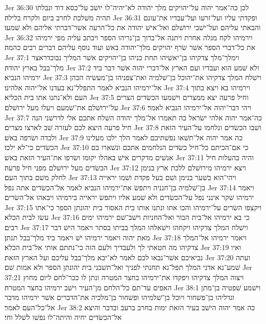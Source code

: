 Jer 36:30  לכן כה־אמר יהוה על־יהויקים מלך יהודה לא־יהיה־לו יושׁב על־כסא דוד ונבלתו תהיה משׁלכת לחרב ביום ולקרח בלילה׃
Jer 36:31  ופקדתי עליו ועל־זרעו ועל־עבדיו את־עונם והבאתי עליהם ועל־ישׁבי ירושׁלם ואל־אישׁ יהודה את כל־הרעה אשׁר־דברתי אליהם ולא שׁמעו׃
Jer 36:32  וירמיהו לקח מגלה אחרת ויתנה אל־ברוך בן־נריהו הספר ויכתב עליה מפי ירמיהו את כל־דברי הספר אשׁר שׂרף יהויקים מלך־יהודה באשׁ ועוד נוסף עליהם דברים רבים כהמה׃
Jer 37:1  וימלך־מלך צדקיהו בן־יאשׁיהו תחת כניהו בן־יהויקים אשׁר המליך נבוכדראצר מלך־בבל בארץ יהודה׃
Jer 37:2  ולא שׁמע הוא ועבדיו ועם הארץ אל־דברי יהוה אשׁר דבר ביד ירמיהו הנביא׃
Jer 37:3  וישׁלח המלך צדקיהו את־יהוכל בן־שׁלמיה ואת־צפניהו בן־מעשׂיה הכהן אל־ירמיהו הנביא לאמר התפלל־נא בעדנו אל־יהוה אלהינו׃
Jer 37:4  וירמיהו בא ויצא בתוך העם ולא־נתנו אתו בית הכליא׃
Jer 37:5  וחיל פרעה יצא ממצרים וישׁמעו הכשׂדים הצרים על־ירושׁלם את־שׁמעם ויעלו מעל ירושׁלם׃
Jer 37:6  ויהי דבר־יהוה אל־ירמיהו הנביא לאמר׃
Jer 37:7  כה־אמר יהוה אלהי ישׂראל כה תאמרו אל־מלך יהודה השׁלח אתכם אלי לדרשׁני הנה חיל פרעה היצא לכם לעזרה שׁב לארצו מצרים׃
Jer 37:8  ושׁבו הכשׂדים ונלחמו על־העיר הזאת ולכדה ושׂרפה באשׁ׃
Jer 37:9  כה אמר יהוה אל־תשׁאו נפשׁתיכם לאמר הלך ילכו מעלינו הכשׂדים כי־לא ילכו׃
Jer 37:10  כי אם־הכיתם כל־חיל כשׂדים הנלחמים אתכם ונשׁארו בם אנשׁים מדקרים אישׁ באהלו יקומו ושׂרפו את־העיר הזאת באשׁ׃
Jer 37:11  והיה בהעלות חיל הכשׂדים מעל ירושׁלם מפני חיל פרעה׃
Jer 37:12  ויצא ירמיהו מירושׁלם ללכת ארץ בנימן לחלק משׁם בתוך העם׃
Jer 37:13  ויהי־הוא בשׁער בנימן ושׁם בעל פקדת ושׁמו יראייה בן־שׁלמיה בן־חנניה ויתפשׂ את־ירמיהו הנביא לאמר אל־הכשׂדים אתה נפל׃
Jer 37:14  ויאמר ירמיהו שׁקר אינני נפל על־הכשׂדים ולא שׁמע אליו ויתפשׂ יראייה בירמיהו ויבאהו אל־השׂרים׃
Jer 37:15  ויקצפו השׂרים על־ירמיהו והכו אתו ונתנו אותו בית האסור בית יהונתן הספר כי־אתו עשׂו לבית הכלא׃
Jer 37:16  כי בא ירמיהו אל־בית הבור ואל־החניות וישׁב־שׁם ירמיהו ימים רבים׃
Jer 37:17  וישׁלח המלך צדקיהו ויקחהו וישׁאלהו המלך בביתו בסתר ויאמר הישׁ דבר מאת יהוה ויאמר ירמיהו ישׁ ויאמר ביד מלך־בבל תנתן׃
Jer 37:18  ויאמר ירמיהו אל־המלך צדקיהו מה חטאתי לך ולעבדיך ולעם הזה כי־נתתם אותי אל־בית הכלא׃
Jer 37:19  ואיו נביאיכם אשׁר־נבאו לכם לאמר לא־יבא מלך־בבל עליכם ועל הארץ הזאת׃
Jer 37:20  ועתה שׁמע־נא אדני המלך תפל־נא תחנתי לפניך ואל־תשׁבני בית יהונתן הספר ולא אמות שׁם׃
Jer 37:21  ויצוה המלך צדקיהו ויפקדו את־ירמיהו בחצר המטרה ונתן לו ככר־לחם ליום מחוץ האפים עד־תם כל־הלחם מן־העיר וישׁב ירמיהו בחצר המטרה׃
Jer 38:1  וישׁמע שׁפטיה בן־מתן וגדליהו בן־פשׁחור ויוכל בן־שׁלמיהו ופשׁחור בן־מלכיה את־הדברים אשׁר ירמיהו מדבר אל־כל־העם לאמר׃
Jer 38:2  כה אמר יהוה הישׁב בעיר הזאת ימות בחרב ברעב ובדבר והיצא אל־הכשׂדים יחיה והיתה־לו נפשׁו לשׁלל וחי׃
